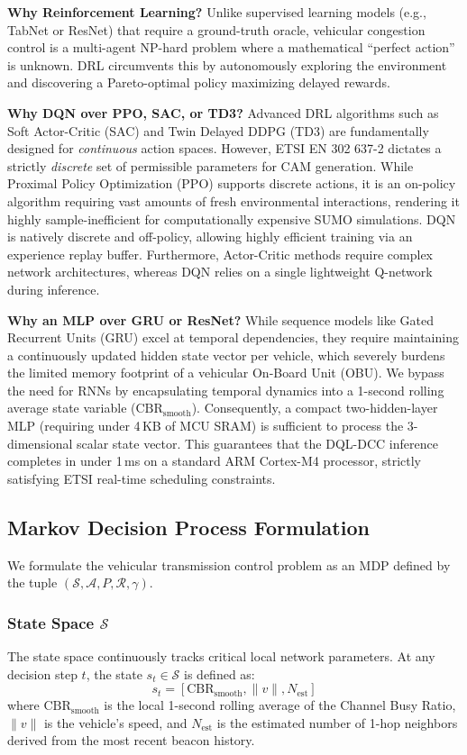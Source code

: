 \documentclass[journal]{IEEEtran}
\begin{document}
\textbf{Why Reinforcement Learning?} Unlike supervised learning models (e.g., TabNet or ResNet) that require a ground-truth oracle, vehicular congestion control is a multi-agent NP-hard problem where a mathematical ``perfect action'' is unknown. DRL circumvents this by autonomously exploring the environment and discovering a Pareto-optimal policy maximizing delayed rewards.

\textbf{Why DQN over PPO, SAC, or TD3?} Advanced DRL algorithms such as Soft Actor-Critic (SAC) and Twin Delayed DDPG (TD3) are fundamentally designed for \emph{continuous} action spaces. However, ETSI EN 302 637-2 dictates a strictly \emph{discrete} set of permissible parameters for CAM generation. While Proximal Policy Optimization (PPO) supports discrete actions, it is an on-policy algorithm requiring vast amounts of fresh environmental interactions, rendering it highly sample-inefficient for computationally expensive SUMO simulations. DQN is natively discrete and off-policy, allowing highly efficient training via an experience replay buffer. Furthermore, Actor-Critic methods require complex network architectures, whereas DQN relies on a single lightweight Q-network during inference.

\textbf{Why an MLP over GRU or ResNet?} While sequence models like Gated Recurrent Units (GRU) excel at temporal dependencies, they require maintaining a continuously updated hidden state vector per vehicle, which severely burdens the limited memory footprint of a vehicular On-Board Unit (OBU). We bypass the need for RNNs by encapsulating temporal dynamics into a 1-second rolling average state variable ($\text{CBR}_{\text{smooth}}$). Consequently, a compact two-hidden-layer MLP (requiring under 4\,KB of MCU SRAM) is sufficient to process the 3-dimensional scalar state vector. This guarantees that the DQL-DCC inference completes in under 1\,ms on a standard ARM Cortex-M4 processor, strictly satisfying ETSI real-time scheduling constraints.


\subsection{Markov Decision Process Formulation}
We formulate the vehicular transmission control problem as an MDP defined
by the tuple $(\mathcal{S}, \mathcal{A}, P, \mathcal{R}, \gamma)$.

\subsubsection{State Space $\mathcal{S}$}
The state space continuously tracks critical local network parameters. At any
decision step $t$, the state $s_t \in \mathcal{S}$ is defined as:
\begin{equation}
s_t = [ \text{CBR}_{\text{smooth}}, \| v \|, N_{\text{est}} ]
\end{equation}
where $\text{CBR}_{\text{smooth}}$ is the local 1-second rolling average of the
Channel Busy Ratio, $\| v \|$ is the vehicle's speed, and $N_{\text{est}}$ is the
estimated number of 1-hop neighbors derived from the most recent beacon history.
\end{document}
